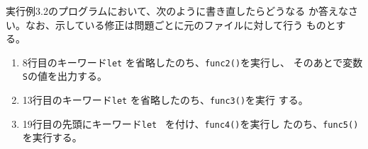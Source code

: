 \begin{Prob}\upshape
 実行例3.2のプログラムにおいて、次のように書き直したらどうなる
 か答えなさい。なお、示している修正は問題ごとに元のファイルに対して行う
 ものとする。
\begin{enumerate}
 \item 8行目のキーワード\Verb+let+ を省略したのち、\Verb+func2()+を実行し、
       そのあとで変数\Verb+S+の値を出力する。
 \item 13行目のキーワード\Verb+let+ を省略したのち、\Verb+func3()+を実行
       する。
 \item 19行目の先頭にキーワード\Verb+let + を付け、\Verb+func4()+を実行し
       たのち、\Verb+func5()+を実行する。
\end{enumerate}
\end{Prob}
